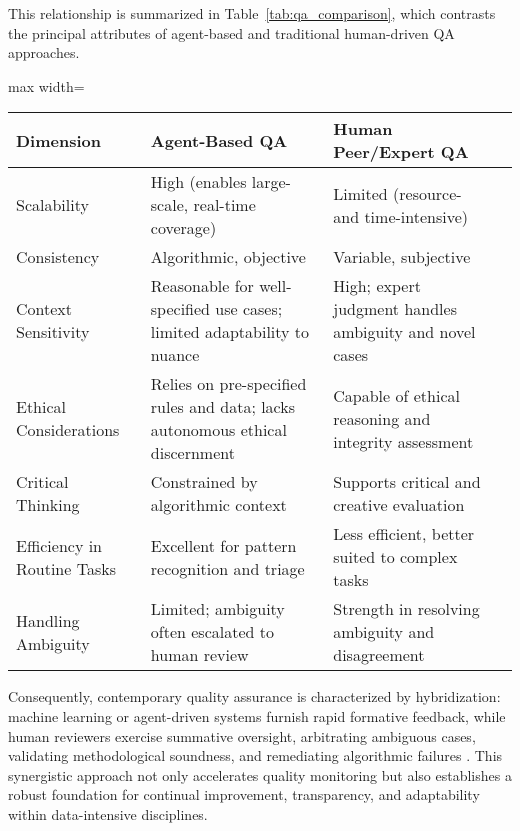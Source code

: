 \documentclass[sigconf]{acmart}
\begin{document}
This relationship is summarized in Table~\ref{tab:qa_comparison}, which contrasts the principal attributes of agent-based and traditional human-driven QA approaches.

\begin{table*}[htbp]
\centering
\caption{Comparison of Agent-Based and Human-Driven Quality Assurance Approaches}
\label{tab:qa_comparison}
\begin{adjustbox}{max width=\textwidth}
\begin{tabular}{@{}llll@{}}
\toprule
Dimension & Agent-Based QA & Human Peer/Expert QA &  \\
\midrule
Scalability & High (enables large-scale, real-time coverage) & Limited (resource- and time-intensive) &  \\
Consistency & Algorithmic, objective & Variable, subjective &  \\
Context Sensitivity & Reasonable for well-specified use cases; limited adaptability to nuance & High; expert judgment handles ambiguity and novel cases &  \\
Ethical Considerations & Relies on pre-specified rules and data; lacks autonomous ethical discernment & Capable of ethical reasoning and integrity assessment &  \\
Critical Thinking & Constrained by algorithmic context & Supports critical and creative evaluation &  \\
Efficiency in Routine Tasks & Excellent for pattern recognition and triage & Less efficient, better suited to complex tasks &  \\
Handling Ambiguity & Limited; ambiguity often escalated to human review & Strength in resolving ambiguity and disagreement &  \\
\bottomrule
\end{tabular}
\end{adjustbox}
\end{table*}

Consequently, contemporary quality assurance is characterized by hybridization: machine learning or agent-driven systems furnish rapid formative feedback, while human reviewers exercise summative oversight, arbitrating ambiguous cases, validating methodological soundness, and remediating algorithmic failures \cite{ref88}\cite{ref89}\cite{ref91}\cite{ref92}\cite{ref96}\cite{ref98}\cite{ref108}. This synergistic approach not only accelerates quality monitoring but also establishes a robust foundation for continual improvement, transparency, and adaptability within data-intensive disciplines.
\end{document}
